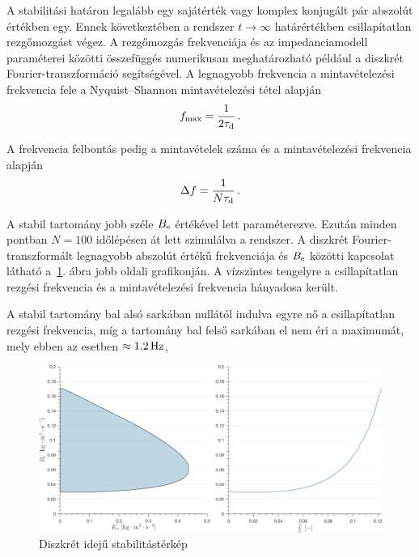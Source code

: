 A stabilitási határon legalább egy sajátérték vagy komplex konjugált pár abszolút értékben egy. Ennek következtében a rendszer 
\(t\rightarrow\infty\) határértékben csillapítatlan rezgőmozgást végez. A rezgőmozgás frekvenciája és az 
impedanciamodell paraméterei közötti összefüggés numerikusan meghatározható például a diszkrét 
Fourier-transzformáció segítségével. A legnagyobb frekvencia a mintavételezési frekvencia fele a Nyquist--Shannon 
mintavételezési tétel alapján 
\begin{align}
    f_{\mathrm{max}} = \frac{1}{2\tau_{\mathrm{d}}}\,.
\end{align}

A frekvencia felbontás pedig a mintavételek száma és a mintavételezési frekvencia alapján
\begin{align}
    \Delta f = \frac{1}{N\tau_{\mathrm{d}}}\,.
\end{align}

A stabil tartomány jobb széle \(B_{\mathrm{e}}\) értékével lett paraméterezve. Ezután minden pontban  
\(N = 100\) időlépésen át lett szimulálva a rendszer. A diszkrét Fourier-transzformált 
legnagyobb abszolút értékű frekvenciája és \(B_{\mathrm{e}}\) közötti kapcsolat látható 
a~\ref{fig:time_delay_stab_map_discrete_fourier}. ábra jobb oldali grafikonján. A vízszintes 
tengelyre a csillapítatlan rezgési frekvencia és a mintavételezési frekvencia hányadosa került.

A stabil tartomány bal alsó sarkában nullától indulva egyre nő a csillapítatlan 
rezgési frekvencia, míg a tartomány bal felső sarkában el nem éri a maximumát, mely ebben az 
esetben \(\approx 1.2\,\mathrm{Hz}\),

\begin{figure}[h]
	\begin{center}
		\includegraphics[width=\textwidth]{images/time_delay_stab_map_discrete_fourier.png}
		\caption{Diszkrét idejű stabilitástérkép}\label{fig:time_delay_stab_map_discrete_fourier}
	\end{center}
\end{figure}